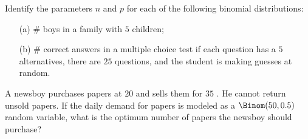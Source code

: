 \begin{problem}[Handout 8, \# 2]
  Identify the parameters \(n\) and \(p\) for each of the following
  binomial distributions:
  \begin{itemize}
  \item[(a)] \(\#\) boys in a family with \(5\) children;
  \item[(b)] \(\#\) correct answers in a multiple choice test if each
    question has a \(5\) alternatives, there are \(25\) questions, and the
    student is making guesses at random.
  \end{itemize}
\end{problem}
\begin{solution}

\end{solution}
\newpage

\begin{problem}[Handout 8, \# 10]
  A newsboy purchases papers at \(20\) \textcent{} and sells them for \(35\)
  \textcent{}. He cannot return unsold papers. If the daily demand for papers
  is modeled as a \(\Binom(50,0.5)\) random variable, what is the optimum
  number of papers the newsboy should purchase?
\end{problem}
\begin{solution}

\end{solution}
\newpage

\begin{problem}[Handout 8, \# 12]
\end{problem}
\begin{solution}

\end{solution}
\newpage

\begin{problem}[Handout 8, \# 13]
\end{problem}
\begin{solution}

\end{solution}
\newpage

\begin{problem}[Handout 8, \# 14]
\end{problem}
\begin{solution}

\end{solution}
\newpage

\begin{problem}[Handout 8, \# 15]
\end{problem}
\begin{solution}

\end{solution}
\newpage

